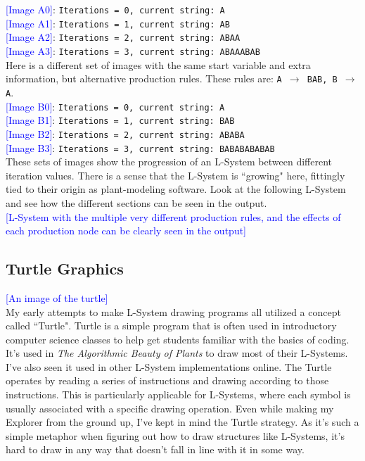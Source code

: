 \documentclass[12pt,twoside]{reedthesis}
\newcommand{\code}[1]{\texttt{#1}}
\begin{document}
\textcolor{blue}{[Image A0]}: \code{Iterations = 0, current string: A}\\
\textcolor{blue}{[Image A1]}: \code{Iterations = 1, current string: AB}\\
\textcolor{blue}{[Image A2]}: \code{Iterations = 2, current string: ABAA}\\
\textcolor{blue}{[Image A3]}: \code{Iterations = 3, current string: ABAAABAB} \\

Here is a different set of images with the same start variable and extra information, but alternative production rules. These rules are: \code{A $\rightarrow$ BAB, B $\rightarrow$ A}.\\

\textcolor{blue}{[Image B0]}: \code{Iterations = 0, current string: A}\\
\textcolor{blue}{[Image B1]}: \code{Iterations = 1, current string: BAB}\\
\textcolor{blue}{[Image B2]}: \code{Iterations = 2, current string: ABABA}\\
\textcolor{blue}{[Image B3]}: \code{Iterations = 3, current string: BABABABABAB} \\

These sets of images show the progression of an L-System between different iteration values. There is a sense that the L-System is ``growing" here, fittingly tied to their origin as plant-modeling software. Look at the following L-System and see how the different sections can be seen in the output.\\

	\textcolor{blue}{[L-System with the multiple very different production rules, and the effects of each production node can be clearly seen in the output]}\\

\subsection{Turtle Graphics}
\label{Turtle-Graphics}

	\textcolor{blue}{[An image of the turtle]}\\

	My early attempts to make L-System drawing programs all utilized a concept called ``Turtle". Turtle is a simple program that is often used in introductory computer science classes to help get students familiar with the basics of coding. It's used in \textit{The Algorithmic Beauty of Plants} to draw most of their L-Systems. I've also seen it used in other L-System implementations online. The Turtle operates by reading a series of instructions and drawing according to those instructions. This is particularly applicable for L-Systems, where each symbol is usually associated with a specific drawing operation. Even while making my Explorer from the ground up, I've kept in mind the Turtle strategy. As it's such a simple metaphor when figuring out how to draw structures like L-Systems, it's hard to draw in any way that doesn't fall in line with it in some way.\\
	
\end{document}
